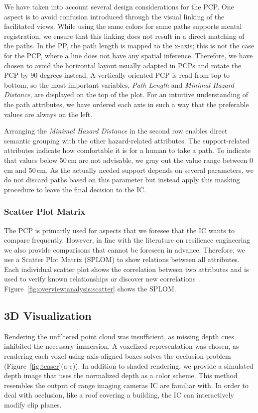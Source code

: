 \documentclass{egpubl}
\begin{document}
We have taken into account several design considerations for the PCP. One aspect is to avoid confusion introduced through the visual linking of the facilitated views. While using the same colors for same paths supports mental registration, we ensure that this linking does not result in a direct matching of the paths. In the PP, the path length is mapped to the x-axis; this is not the case for the PCP, where a line does not have any spatial inference. Therefore, we have chosen to avoid the horizontal layout usually adapted in PCPs and rotate the PCP by 90 degrees instead. A vertically oriented PCP is read from top to bottom, so the most important variables, \emph{Path Length} and \emph{Minimal Hazard Distance}, are displayed on the top of the plot. For an intuitive understanding of the path attributes, we have ordered each axis in such a way that the preferable values are always on the left. 

Arranging the \emph{Minimal Hazard Distance} in the second row enables direct semantic grouping with the other hazard-related attributes. The support-related attributes indicate how comfortable it is for a human to take a path. To indicate that values below 50\,cm are not advisable, we gray out the value range between 0\,cm and 50\,cm. As the actually needed support depends on several parameters, we do not discard paths based on this parameter but instead apply this masking procedure to leave the final decision to the IC.

\subsubsection{Scatter Plot Matrix} \label{sec:overview:analysis:scatter}
The PCP is primarily used for aspects that we foresee that the IC wants to compare frequently. However, in line with the literature on resilience engineering~\cite{Lundberg2012} we also provide comparisons that cannot be foreseen in advance. Therefore, we use a Scatter Plot Matrix (SPLOM) to show relations between all attributes. Each individual scatter plot shows the correlation between two attributes and is used to verify known relationships or discover new correlations~\cite{Li2008}. Figure~\ref{fig:overview:analysis:scatter} shows the SPLOM.

\subsection{3D Visualization} \label{sec:overview:3dvisualization}
 Rendering the unfiltered point cloud was insufficient, as missing depth cues inhibited the necessary immersion. A voxelized representation was chosen, as rendering each voxel using axis-aligned boxes solves the occlusion problem (Figure~\ref{fig:teaser}(a-c)). In addition to shaded rendering, we provide a simulated depth image that uses the normalized depth as a color scheme. This method resembles the output of range imaging cameras IC are familiar with. In order to deal with occlusion, like a roof covering a building, the IC can interactively modify clip planes.
\end{document}

